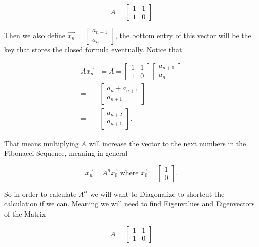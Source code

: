 \documentclass{article}
\begin{document}
\begin{equation*}
    A=\begin{bmatrix}
        1 & 1 \\
        1 & 0
    \end{bmatrix}
\end{equation*}

Then we also define $\vec{x_n}=\begin{bmatrix} a_{n+1} \\ a_n \end{bmatrix}$, the bottom entry of this vector will be the key that stores the closed formula eventually. Notice that 

\begin{align*}
    A\vec{x_n}&=A=\begin{bmatrix}
        1 & 1 \\
        1 & 0
    \end{bmatrix} \begin{bmatrix} a_{n+1} \\ a_n \end{bmatrix} \\
    =& \begin{bmatrix} a_n+a_{n+1} \\ a_{n+1} \end{bmatrix} \\
    =& \begin{bmatrix} a_{n+2} \\ a_{n+1} \end{bmatrix}.
\end{align*}

That means multiplying $A$ will increase the vector to the next numbers in the Fibonacci Sequence, meaning in general

\begin{equation*}
    \vec{x_n}=A^n\vec{x_0} \text{ where } \vec{x_0}=\begin{bmatrix} 1 \\ 0 \end{bmatrix}.
\end{equation*}

So in order to calculate $A^n$ we will want to Diagonalize to shortcut the calculation if we can. Meaning we will need to find Eigenvalues and Eigenvectors of the Matrix

\begin{equation*}
    A=\begin{bmatrix}
        1 & 1 \\
        1 & 0
    \end{bmatrix}
\end{equation*}
\end{document}
